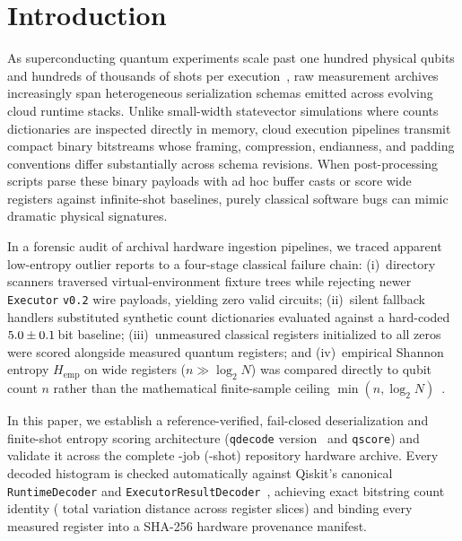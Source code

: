 \documentclass[twocolumn,aps,prapplied,superscriptaddress,floatfix]{revtex4-2}
\begin{document}
\maketitle

\section{Introduction}\label{sec:intro}

As superconducting quantum experiments scale past one hundred physical qubits and hundreds of thousands of shots per execution~\cite{bravyi2024,nation2023}, raw measurement archives increasingly span heterogeneous serialization schemas emitted across evolving cloud runtime stacks. Unlike small-width statevector simulations where counts dictionaries are inspected directly in memory, cloud execution pipelines transmit compact binary bitstreams whose framing, compression, endianness, and padding conventions differ substantially across schema revisions. When post-processing scripts parse these binary payloads with ad hoc buffer casts or score wide registers against infinite-shot baselines, purely classical software bugs can mimic dramatic physical signatures.

In a forensic audit of archival hardware ingestion pipelines, we traced apparent low-entropy outlier reports to a four-stage classical failure chain: (i)~directory scanners traversed virtual-environment fixture trees while rejecting newer \texttt{Executor} \texttt{v0.2} wire payloads, yielding zero valid circuits; (ii)~silent fallback handlers substituted synthetic count dictionaries evaluated against a hard-coded $5.0 \pm 0.1$\,bit baseline; (iii)~unmeasured classical registers initialized to all zeros were scored alongside measured quantum registers; and (iv)~empirical Shannon entropy $H_{\mathrm{emp}}$ on wide registers ($n \gg \log_2 N$) was compared directly to qubit count $n$ rather than the mathematical finite-sample ceiling $\min(n, \log_2 N)$~\cite{shannon1948,miller1955,paninski2003}.

In this paper, we establish a reference-verified, fail-closed deserialization and finite-shot entropy scoring architecture (\texttt{qdecode} version~\texttt{\QdDecoderVersion} and \texttt{qscore}) and validate it across the complete \QdTotalJobs{}-job (\QdTotalCorpusShots{}-shot) repository hardware archive. Every decoded histogram is checked automatically against Qiskit's canonical \texttt{RuntimeDecoder} and \texttt{ExecutorResultDecoder}~\cite{qiskit2026}, achieving exact bitstring count identity (\QdRefParityTvd{} total variation distance across \QdTotalSlices{} register slices) and binding every measured register into a SHA-256 hardware provenance manifest.
\end{document}

